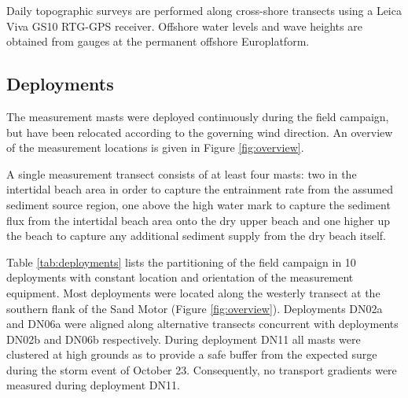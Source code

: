 Daily topographic surveys are performed along cross-shore transects
using a Leica Viva GS10 RTG-GPS receiver. Offshore water levels and
wave heights are obtained from gauges at the permanent offshore
Europlatform.

\subsection{Deployments}

The measurement masts were deployed continuously during the field
campaign, but have been relocated according to the governing wind
direction. An overview of the measurement locations is given in Figure
\ref{fig:overview}. 

A single measurement transect consists of at least four masts: two in
the intertidal beach area in order to capture the entrainment rate
from the assumed sediment source region, one above the high water mark
to capture the sediment flux from the intertidal beach area onto the
dry upper beach and one higher up the beach to capture any additional
sediment supply from the dry beach itself. 

Table \ref{tab:deployments} lists the partitioning of the field
campaign in 10 deployments with constant location and orientation of
the measurement equipment. Most deployments were located along the
westerly transect at the southern flank of the Sand Motor (Figure
\ref{fig:overview}). Deployments DN02a and DN06a were aligned along
alternative transects concurrent with deployments DN02b and DN06b
respectively. During deployment DN11 all masts were clustered at high
grounds as to provide a safe buffer from the expected surge during the
storm event of October 23. Consequently, no transport gradients were
measured during deployment DN11.

